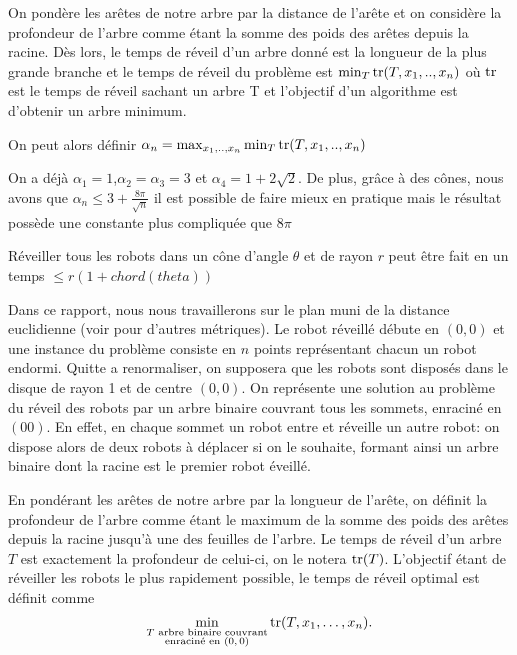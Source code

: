 On pondère les arêtes de notre arbre par la distance de l'arête et on considère la profondeur de l'arbre comme étant la somme des poids des arêtes depuis la racine. Dès lors, le temps de réveil d'un arbre donné est la longueur de la plus grande branche et le temps de réveil du problème est $\min_{T} \operatorname{tr}(T, x_1, .., x_n)$ où $\operatorname{tr}$ est le temps de réveil sachant un arbre T et l'objectif d'un algorithme est d'obtenir un arbre minimum.

On peut alors définir $\alpha_n = \max_{x_1, .., x_n} \min_T \operatorname{tr}(T, x_1, ..,
x_n)$

On a déjà $\alpha_1 = 1$,$\alpha_2 = \alpha_3 = 3$ et $\alpha_4 = 1 + 2\sqrt{2}$. De plus, grâce à des cônes, nous avons que $\alpha_n \leq 3 + \frac{8\pi}{\sqrt{n}}$ il est possible de faire mieux en pratique mais le résultat possède une constante plus compliquée que $8\pi$

\begin{theorem}
  Réveiller tous les robots dans un cône d'angle $\theta$ et de rayon $r$
  peut être fait en un temps $\leq r(1 + chord(theta))$
\end{theorem}



Dans ce rapport, nous nous travaillerons sur le plan muni de la distance
euclidienne (voir \cite{} pour d'autres métriques). Le robot réveillé débute en
$(0,0)$ et une instance du problème consiste en $n$ points représentant chacun
un robot endormi. Quitte a renormaliser, on supposera que les robots sont
disposés dans le disque de rayon 1 et de centre $(0,0)$. On représente une
solution au problème du réveil des robots par un arbre binaire couvrant tous les
sommets, enraciné en $(00)$. En effet, en chaque sommet un robot entre et
réveille un autre robot: on dispose alors de deux robots à déplacer si on le
souhaite, formant ainsi un arbre binaire dont la racine est le premier robot
éveillé.

En pondérant les arêtes de notre arbre par la longueur de l'arête, on définit la
profondeur de l'arbre comme étant le maximum de la somme des poids des arêtes
depuis la racine jusqu'à une des feuilles de l'arbre. Le temps de réveil d'un
arbre $T$ est exactement la profondeur de celui-ci, on le notera
$\operatorname{tr}(T)$. L'objectif étant de réveiller les robots le plus rapidement possible,
le temps de réveil optimal est définit comme
$$\min_{\substack{T \text{ arbre binaire couvrant}\\ \text{enraciné en $(0,0)$}}} \operatorname{tr}(T, x_1, \dots,
  x_n).$$

